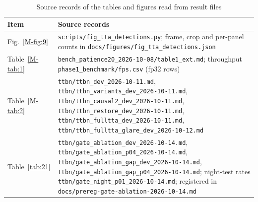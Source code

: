 \documentclass[journal,onecolumn]{IEEEtran}
\begin{document}
\begin{table}[htbp]
\centering
\footnotesize
\caption{Source records of the tables and figures read from result files}
\label{tab:20}
\begin{tabularx}{\linewidth}{l>{\raggedright\arraybackslash}X}
\toprule
Item & Source records \\
\midrule
Fig.~\ref{M-fig:9} & \texttt{scripts/\allowbreak{}fig\_\allowbreak{}tta\_\allowbreak{}detections.py}; frame, crop and per-panel counts in \texttt{docs/\allowbreak{}figures/\allowbreak{}fig\_\allowbreak{}tta\_\allowbreak{}detections.json} \\
Table~\ref{M-tab:1} & \texttt{bench\_\allowbreak{}patience20\_\allowbreak{}2026-\allowbreak{}10-\allowbreak{}08/\allowbreak{}table1\_\allowbreak{}ext.md}; throughput \texttt{phase1\_\allowbreak{}benchmark/\allowbreak{}fps.csv} (fp32 rows) \\
Table~\ref{M-tab:2} & \texttt{ttbn/\allowbreak{}ttbn\_\allowbreak{}dev\_\allowbreak{}2026-\allowbreak{}10-\allowbreak{}11.md}, \texttt{ttbn/\allowbreak{}ttbn\_\allowbreak{}variants\_\allowbreak{}dev\_\allowbreak{}2026-\allowbreak{}10-\allowbreak{}11.md}, \texttt{ttbn/\allowbreak{}ttbn\_\allowbreak{}causal2\_\allowbreak{}dev\_\allowbreak{}2026-\allowbreak{}10-\allowbreak{}11.md}, \texttt{ttbn/\allowbreak{}ttbn\_\allowbreak{}restore\_\allowbreak{}dev\_\allowbreak{}2026-\allowbreak{}10-\allowbreak{}11.md}, \texttt{ttbn/\allowbreak{}ttbn\_\allowbreak{}fulltta\_\allowbreak{}dev\_\allowbreak{}2026-\allowbreak{}10-\allowbreak{}11.md}, \texttt{ttbn/\allowbreak{}ttbn\_\allowbreak{}fulltta\_\allowbreak{}glare\_\allowbreak{}dev\_\allowbreak{}2026-\allowbreak{}10-\allowbreak{}12.md} \\
Table~\ref{tab:21} & \texttt{ttbn/\allowbreak{}gate\_\allowbreak{}ablation\_\allowbreak{}dev\_\allowbreak{}2026-\allowbreak{}10-\allowbreak{}14.md}, \texttt{ttbn/\allowbreak{}gate\_\allowbreak{}ablation\_\allowbreak{}p04\_\allowbreak{}2026-\allowbreak{}10-\allowbreak{}14.md}, \texttt{ttbn/\allowbreak{}gate\_\allowbreak{}ablation\_\allowbreak{}gap\_\allowbreak{}dev\_\allowbreak{}2026-\allowbreak{}10-\allowbreak{}14.md}, \texttt{ttbn/\allowbreak{}gate\_\allowbreak{}ablation\_\allowbreak{}gap\_\allowbreak{}p04\_\allowbreak{}2026-\allowbreak{}10-\allowbreak{}14.md}; night-test rates \texttt{ttbn/\allowbreak{}gate\_\allowbreak{}night\_\allowbreak{}p01\_\allowbreak{}2026-\allowbreak{}10-\allowbreak{}14.md}; registered in \texttt{docs/\allowbreak{}prereg-\allowbreak{}gate-\allowbreak{}ablation-\allowbreak{}2026-\allowbreak{}10-\allowbreak{}14.md} \\

\end{tabularx}
\end{table}
\end{document}
